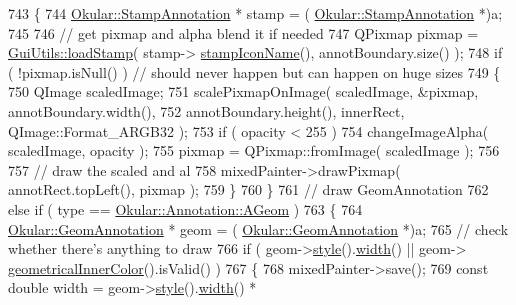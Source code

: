 \begin{DoxyCode}
743             \{
744                 \hyperlink{classOkular_1_1StampAnnotation}{Okular::StampAnnotation} * stamp = (
      \hyperlink{classOkular_1_1StampAnnotation}{Okular::StampAnnotation} *)a;
745 
746                 \textcolor{comment}{// get pixmap and alpha blend it if needed}
747                 QPixmap pixmap = \hyperlink{namespaceGuiUtils_a5ba797636890ba5fbc39db6a092f4bd5}{GuiUtils::loadStamp}( stamp->
      \hyperlink{classOkular_1_1StampAnnotation_a444978f06c11e4f74fbf1653555b4170}{stampIconName}(), annotBoundary.size() );
748                 \textcolor{keywordflow}{if} ( !pixmap.isNull() ) \textcolor{comment}{// should never happen but can happen on huge sizes}
749                 \{
750                     QImage scaledImage;
751                     scalePixmapOnImage( scaledImage, &pixmap, annotBoundary.width(),
752                                         annotBoundary.height(), innerRect, QImage::Format\_ARGB32 );
753                     \textcolor{keywordflow}{if} ( opacity < 255 )
754                         changeImageAlpha( scaledImage, opacity );
755                     pixmap = QPixmap::fromImage( scaledImage );
756 
757                     \textcolor{comment}{// draw the scaled and al}
758                     mixedPainter->drawPixmap( annotRect.topLeft(), pixmap );
759                 \}
760             \}
761             \textcolor{comment}{// draw GeomAnnotation}
762             \textcolor{keywordflow}{else} \textcolor{keywordflow}{if} ( type == \hyperlink{classOkular_1_1Annotation_af71b46e37d5f850b97d5c4de3be9aac0a2c11d328af34f5526fd9e761297fb3c2}{Okular::Annotation::AGeom} )
763             \{
764                 \hyperlink{classOkular_1_1GeomAnnotation}{Okular::GeomAnnotation} * geom = (
      \hyperlink{classOkular_1_1GeomAnnotation}{Okular::GeomAnnotation} *)a;
765                 \textcolor{comment}{// check whether there's anything to draw}
766                 \textcolor{keywordflow}{if} ( geom->\hyperlink{classOkular_1_1Annotation_ae1f845ddbd6d524b2b388c6c9ef26423}{style}().\hyperlink{classOkular_1_1Annotation_1_1Style_a5a8e23f3a4f95e25f45770937dc82948}{width}() || geom->
      \hyperlink{classOkular_1_1GeomAnnotation_a5c84e1cbdf0d2bb6b75b6d6b049af63b}{geometricalInnerColor}().isValid() )
767                 \{
768                     mixedPainter->save();
769                     \textcolor{keyword}{const} \textcolor{keywordtype}{double} width = geom->\hyperlink{classOkular_1_1Annotation_ae1f845ddbd6d524b2b388c6c9ef26423}{style}().\hyperlink{classOkular_1_1Annotation_1_1Style_a5a8e23f3a4f95e25f45770937dc82948}{width}() * 

\end{DoxyCode}

